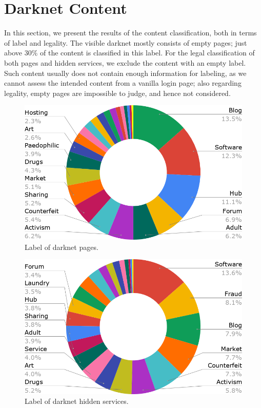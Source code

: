\documentclass[USenglish,oneside,twocolumn]{article}
\begin{document}
\section{Darknet Content}
\label{sec:results}

In this section, we present the results of the content classification, both in terms of label and legality. 
The visible darknet mostly consists of empty pages; just above $30\%$ of the content is classified in this label. 
For the legal classification of both pages and hidden services, we exclude the content with an empty label. Such content usually does not contain enough information for labeling, as we cannot assess the intended content from a vanilla login page; also regarding legality, empty pages are impossible to judge, and hence not considered.

\begin{figure}[h]
\includegraphics[width=\linewidth]{images/labelsByContent.png}
\caption{Label of darknet pages.}
\label{fig:labelsByContent}
\end{figure}

\begin{figure}[h]
\includegraphics[width=\linewidth]{images/labelsByHost.png}
\caption{Label of darknet hidden services.}
\label{fig:labelsByHost}
\end{figure}
\end{document}
